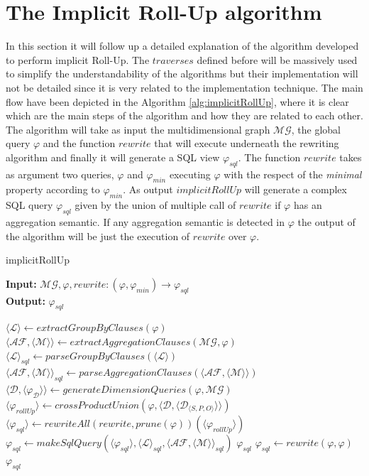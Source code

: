 \documentclass[12pt,a4paper]{report}
\newcommand\globalQuery{\varphi}
\newcommand\sqlQuery{\varphi_{sql}}
\newcommand\subject{S}
\newcommand\predicate{P}
\newcommand\object{O}
\newcommand\triple[1]{#1_{\set{\subject,\predicate,\object}}}
\newcommand\dimension{\mathcal{D}}
\newcommand\level{\mathcal{L}}
\newcommand\measure{\mathcal{M}}
\newcommand\multidimensionalGraph{\mathcal{MG}}
\newcommand\aggregatingFunction{\mathcal{AF}}
\newcommand\set[1]{\langle #1 \rangle}
\newcommand\dimensionQuery{\globalQuery_{\dimension}}
\begin{document}
\section{The Implicit Roll-Up algorithm} \label{Implicit RollUp}
In this section it will follow up a detailed explanation of the algorithm developed to perform implicit Roll-Up.
%
The $traverses$ defined before will be massively used to simplify the understandability of the algorithms but their implementation will not be detailed since it is very related to the implementation technique.
%
The main flow have been depicted in the Algorithm \ref{alg:implicitRollUp}, where it is clear which are the main steps of the algorithm and how they are related to each other.
%
The algorithm will take as input the multidimensional graph $\multidimensionalGraph$, the global query $\globalQuery$ and the function $rewrite$ that will execute underneath the rewriting algorithm and finally it will generate a SQL view $\sqlQuery$.
%
The function $rewrite$ takes as argument two queries, $\globalQuery$ and $\globalQuery_{min}$ executing $\globalQuery$ with the respect of the \textit{minimal} property according to $\globalQuery_{min}$.
%
As output $implicitRollUp$ will generate a complex SQL query $\sqlQuery$ given by the union of multiple call of $rewrite$ if $\globalQuery$ has an aggregation semantic.
%
If any aggregation semantic is detected in $\globalQuery$ the output of the algorithm will be just the execution of $rewrite$ over $\globalQuery$.
%
\begin{algorithm}[ht]
\caption{implicitRollUp}\label{alg:implicitRollUp}
\textbf{Input:} $\multidimensionalGraph,\globalQuery,rewrite:(\globalQuery,\globalQuery_{min}) \rightarrow \sqlQuery$\\
\textbf{Output:} $\sqlQuery$
\begin{algorithmic}[1]
\If{$canAggragate(\globalQuery)$}
    \State $\set{\level} \gets extractGroupByClauses(\globalQuery)$
    \State $\langle \aggregatingFunction,\langle \measure \rangle \rangle \gets extractAggregationClauses(\multidimensionalGraph,\globalQuery)$
    \State $\set{\level}_{sql} \gets parseGroupByClauses(\set{\level})$
    \State $\langle \aggregatingFunction,\langle \measure \rangle \rangle_{sql} \gets parseAggregationClauses(\langle \aggregatingFunction,\langle \measure \rangle \rangle)$
    \State $\set{\dimension, \set{\dimensionQuery}} \gets generateDimensionQueries(\globalQuery,\multidimensionalGraph)$
    \State $\set{\globalQuery_{rollUp}} \gets crossProductUnion(\globalQuery,\set{\dimension, \set{\triple{\dimension}}})$
    \State $\set{\sqlQuery} \gets rewriteAll(rewrite,prune(\globalQuery))(\set{\globalQuery_{rollUp}})$
    \State $\sqlQuery \gets makeSqlQuery(\set{\sqlQuery},\set{\level}_{sql},\langle \aggregatingFunction,\langle \measure \rangle \rangle_{sql})$
    \State \Return $\sqlQuery$
\Else
    \State $\sqlQuery \gets rewrite(\globalQuery,\globalQuery)$
    \State \Return $\sqlQuery$
\EndIf
\end{algorithmic}
\end{algorithm}
\end{document}
